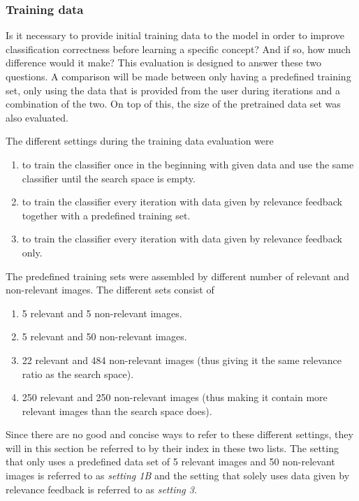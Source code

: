 \subsubsection{Training data}
\label{sec:method:eval:param:training}

Is it necessary to provide initial training data to the model in order to improve classification correctness before learning a specific concept? And if so, how much difference would it make? This evaluation is designed to answer these two questions. A comparison will be made between only having a predefined training set, only using the data that is provided from the user during iterations and a combination of the two. On top of this, the size of the pretrained data set was also evaluated. 

The different settings during the training data evaluation were 
\begin{enumerate}
	\item to train the classifier once in the beginning with given data and use the same classifier until the search space is empty. 
	\item to train the classifier every iteration with data given by relevance feedback together with a predefined training set. 
	\item to train the classifier every iteration with data given by relevance feedback only.
\end{enumerate}
\medskip
The predefined training sets were assembled by different number of relevant and non-relevant images. The different sets consist of
\begin{enumerate}[label=\Alph*.]
	\item 5 relevant and 5 non-relevant images.
	\item 5 relevant and 50 non-relevant images.
	\item 22 relevant and 484 non-relevant images (thus giving it the same relevance ratio as the search space).
	\item 250 relevant and 250 non-relevant images (thus making it contain more relevant images than the search space does).
\end{enumerate}
\medskip
Since there are no good and concise ways to refer to these different settings, they will in this section be referred to by their index in these two lists. The setting that only uses a predefined data set of 5 relevant images and 50 non-relevant images is referred to as \emph{setting 1B} and the setting that solely uses data given by relevance feedback is referred to as \emph{setting 3}.


